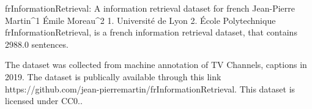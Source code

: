 
frInformationRetrieval: A information retrieval dataset for french
Jean-Pierre Martin^1 Émile Moreau^2
1. Université de Lyon 2. École Polytechnique
frInformationRetrieval, is a french information retrieval dataset, that contains 2988.0 sentences.

The dataset was collected from machine annotation of TV Channels, captions in 2019. 
The dataset is publically available through this link https://github.com/jean-pierremartin/frInformationRetrieval. This dataset is licensed under CC0..

